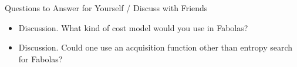 


\begin{frame}{Questions to Answer for Yourself / Discuss with Friends}

\bigskip

\begin{itemize}
    \item \alert{Discussion.} What kind of cost model would you use in Fabolas?
\medskip
	\item \alert{Discussion.} Could one use an acquisition function other than entropy search for Fabolas?    

\end{itemize}

\end{frame}